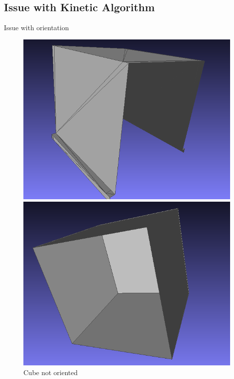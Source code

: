 \documentclass[10pt]{beamer}
\begin{document}
\subsection{Issue with Kinetic Algorithm}
\begin{frame}{Issue with orientation}
    \begin{figure}
        \centering
        \begin{minipage}[b]{0.3\textwidth}
          \centering
          \includegraphics[width=\textwidth]{../image/cube_3faces.png}
          \caption{Cube not oriented}
        \end{minipage}%
        \begin{minipage}[b]{0.3\textwidth}
          \centering
          \includegraphics[width=\textwidth]{../image/cube_5faces.png}

\end{minipage}
\end{figure}
\end{frame}
\end{document}

